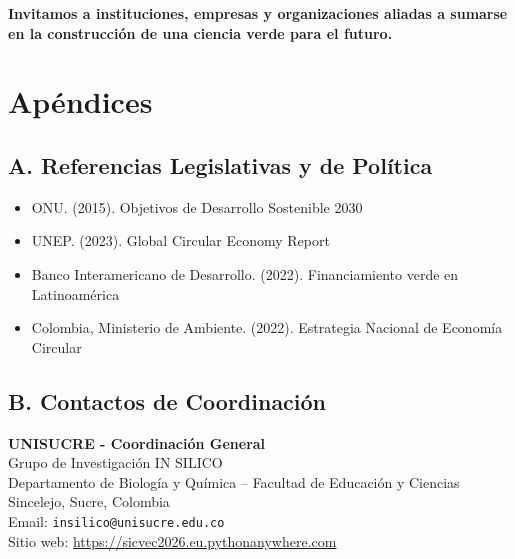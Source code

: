 \documentclass[12pt,a4paper]{article}
\begin{document}
\vspace{1cm}

\textbf{Invitamos a instituciones, empresas y organizaciones aliadas a sumarse en la construcción de una ciencia verde para el futuro.}

\section*{Apéndices}

\subsection*{A. Referencias Legislativas y de Política}

\begin{itemize}
  \item ONU. (2015). Objetivos de Desarrollo Sostenible 2030
  \item UNEP. (2023). Global Circular Economy Report
  \item Banco Interamericano de Desarrollo. (2022). Financiamiento verde en Latinoamérica
  \item Colombia, Ministerio de Ambiente. (2022). Estrategia Nacional de Economía Circular
\end{itemize}

\subsection*{B. Contactos de Coordinación}

\textbf{UNISUCRE - Coordinación General}\\
Grupo de Investigación IN SILICO\\
Departamento de Biología y Química -- Facultad de Educación y Ciencias\\
Sincelejo, Sucre, Colombia\\
Email: \texttt{insilico@unisucre.edu.co}\\
Sitio web: \url{https://sicvec2026.eu.pythonanywhere.com}
\end{document}
